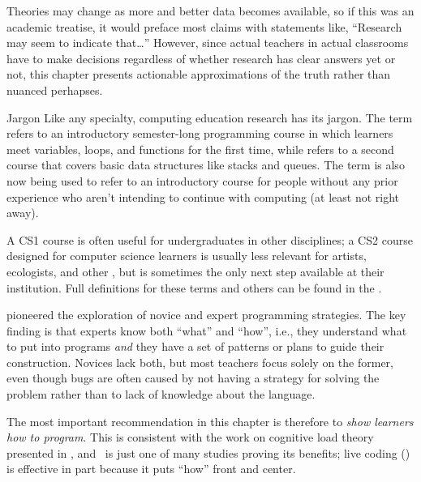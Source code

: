Theories may change as more and better data becomes available, so if
this was an academic treatise, it would preface most claims with
statements like, ``Research may seem to indicate that{\ldots}''
However, since actual teachers in actual classrooms have to make
decisions regardless of whether research has clear answers yet or not,
this chapter presents actionable approximations of the truth rather than
nuanced perhapses.

\begin{aside}{Jargon}
  Like any specialty, computing education research has its jargon. The
  term  refers to an introductory semester-long
  programming course in which learners meet variables, loops, and
  functions for the first time, while  refers to
  a second course that covers basic data structures like stacks and
  queues. The term  is also now being used to
  refer to an introductory course for people without any prior
  experience who aren't intending to continue with computing (at least
  not right away).

  A CS1 course is often useful for undergraduates in other
  disciplines; a CS2 course designed for computer science learners is
  usually less relevant for artists, ecologists, and other , but is sometimes the only next
  step available at their institution. Full definitions for these
  terms and others can be found in the .
\end{aside}


\cite{Solo1984,Solo1986} pioneered the exploration of novice and
expert programming strategies. The key finding is that experts know both
``what'' and ``how'', i.e., they understand what to put into programs \emph{and}
they have a set of patterns or plans to guide their construction.
Novices lack both, but most teachers focus solely on the former, even
though bugs are often caused by not having a strategy for solving the
problem rather than to lack of knowledge about the language.

The most important recommendation in this chapter is therefore to \emph{show
learners how to program}. This is consistent with the work on cognitive
load theory presented in , and~\cite{Mull2007b} is
just one of many studies proving its benefits; live coding
() is effective in part because it puts
``how'' front and center.

